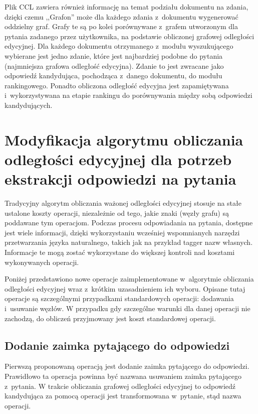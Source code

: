 \documentclass[a4paper, twoside, 12pt]{report}
\begin{document}
        Plik CCL zawiera również informację na temat podziału dokumentu na zdania, dzięki czemu ,,Grafon'' może dla każdego
        zdania z~dokumentu wygenerować oddzielny graf. Grafy te są po kolei porównywane z~grafem utworzonym dla pytania
        zadanego przez użytkownika, na podstawie obliczonej grafowej odległości edycyjnej. Dla każdego dokumentu otrzymanego
        z~modułu wyszukującego wybierane jest jedno zdanie, które jest najbardziej podobne do pytania (najmniejsza grafowa
        odległość edycyjna). Zdanie to jest zwracane jako odpowiedź kandydująca, pochodząca z~danego dokumentu, do modułu
        rankingowego. Ponadto obliczona odległość edycyjna jest zapamiętywana i~wykorzystywana na etapie rankingu do porównywania
        między sobą odpowiedzi kandydujących.

    \section{Modyfikacja algorytmu obliczania odległości edycyjnej dla potrzeb ekstrakcji odpowiedzi na pytania}
        Tradycyjny algorytm obliczania ważonej odległości edycyjnej stosuje na stałe ustalone koszty operacji, niezależnie
        od tego, jakie znaki (węzły grafu) są poddawane tym operacjom. Podczas procesu odpowiadania na pytania, dostępne
        jest wiele informacji, dzięki wykorzystaniu wcześniej wspomnianych narzędzi przetwarzania języka naturalnego,
        takich jak na przykład tagger nazw własnych. Informacje te mogą zostać wykorzystane do większej kontroli nad
        kosztami wykonywanych operacji. %

        Poniżej przedstawiono nowe operacje zaimplementowane w~algorytmie obliczania odległości edycyjnej wraz z~krótkim
        uzasadnieniem ich wyboru. Opisane tutaj operacje są szczególnymi przypadkami standardowych operacji: dodawania
        i~usuwanie węzłów. W przypadku gdy szczególne warunki dla danej operacji nie zachodzą, do obliczeń przyjmowany
        jest koszt standardowej operacji.

        \subsection{Dodanie zaimka pytającego do odpowiedzi}
            Pierwszą proponowaną operacją jest dodanie zaimka pytającego do odpowiedzi. Prawidłowo ta operacja powinna być
            nazwana usuwaniem zaimka pytającego z~pytania. W trakcie obliczania grafowej odległości edycyjnej
            to odpowiedź kandydująca za pomocą operacji jest transformowana w~pytanie, stąd nazwa operacji.
\end{document}
